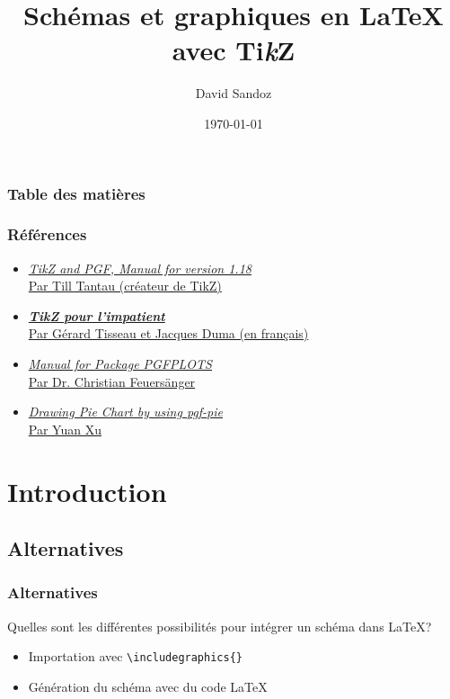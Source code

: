 \documentclass{clic_latex_beamer}
\newcommand{\TikZ}{Ti\textit{k}Z}
\begin{document}
\title{Schémas et graphiques en \LaTeX{} avec \TikZ}
\author{David Sandoz}
\date{\today}
\titlegraphic{\ccbysa}

\frame{\titlepage}


\begin{frame}
\frametitle{Table des matières}
\begin{multicols}{2}
\tableofcontents[]
\end{multicols}
\end{frame}

 
\begin{frame}
\frametitle{Références}
\begin{itemize}
\item \href{http://paws.wcu.edu/tsfoguel/tikzpgfmanual.pdf }{\emph{\TikZ{} and PGF, Manual for version 1.18}\\ Par Till Tantau (créateur de TikZ)}
\item \href{http://math.et.info.free.fr/TikZ/bdd/TikZ-Impatient.pdf}{\emph{\textbf{\TikZ{} pour l’impatient}}\\ Par Gérard Tisseau et Jacques Duma (en français)}
\item \href{http://pgfplots.sourceforge.net/pgfplots.pdf}{\emph{Manual for Package \uppercase{pgfplots}}\\ Par Dr. Christian Feuersänger}
\item \href{http://pgf-pie.googlecode.com/git/release/pgf-pie-0.2/pgf-pie-manual.pdf}{\emph{Drawing Pie Chart by using pgf-pie}\\ Par Yuan Xu}
\end{itemize}
\end{frame}


\section{Introduction}
\subsection{Alternatives}
\begin{frame}
\frametitle{Alternatives}
Quelles sont les différentes possibilités pour intégrer un schéma dans \LaTeX ?
\begin{itemize}
\item Importation avec \texttt{\textbackslash includegraphics\{\}}
\item Génération du schéma avec du code \LaTeX
\end{itemize}
\end{frame}
 
\end{document}
